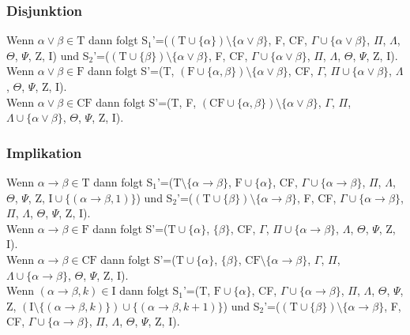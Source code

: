 \subsubsection{Disjunktion}
Wenn $\alpha\vee\beta\in\textrm{T}$ dann folgt S$_{1}$'=($(\textrm{T}\cup\lbrace\alpha\rbrace)\setminus\lbrace\alpha\vee\beta\rbrace$, F, CF, $\Gamma\cup\lbrace\alpha\vee\beta\rbrace$, $\Pi$, $\Lambda$, $\Theta$, $\Psi$, Z, I) und S$_{2}$'=($(\textrm{T}\cup\lbrace\beta\rbrace)\setminus\lbrace\alpha\vee\beta\rbrace$, F, CF, $\Gamma\cup\lbrace\alpha\vee\beta\rbrace$, $\Pi$, $\Lambda$, $\Theta$, $\Psi$, Z, I).\\
Wenn $\alpha\vee\beta\in\textrm{F}$ dann folgt S'=(T, $(\textrm{F}\cup\lbrace\alpha,\beta\rbrace)\setminus\lbrace\alpha\vee\beta\rbrace$, CF, $\Gamma$, $\Pi\cup\lbrace\alpha\vee\beta\rbrace$, $\Lambda$, $\Theta$, $\Psi$, Z, I).\\
Wenn $\alpha\vee\beta\in\textrm{CF}$ dann folgt S'=(T, F, $(\textrm{CF}\cup\lbrace\alpha,\beta\rbrace)\setminus\lbrace\alpha\vee\beta\rbrace$, $\Gamma$, $\Pi$, $\Lambda\cup\lbrace\alpha\vee\beta\rbrace$, $\Theta$, $\Psi$, Z, I).

\subsubsection{Implikation}
Wenn $\alpha\rightarrow\beta\in\textrm{T}$ dann folgt S$_{1}$'=($\textrm{T}\setminus\lbrace\alpha\rightarrow\beta\rbrace$, $\textrm{F}\cup\lbrace\alpha\rbrace$, CF, $\Gamma\cup\lbrace\alpha\rightarrow\beta\rbrace$, $\Pi$, $\Lambda$, $\Theta$, $\Psi$, Z, $\textrm{I}\cup\lbrace(\alpha\rightarrow\beta, 1)\rbrace$) und S$_{2}$'=($(\textrm{T}\cup\lbrace\beta\rbrace)\setminus\lbrace\alpha\rightarrow\beta\rbrace$, F, CF, $\Gamma\cup\lbrace\alpha\rightarrow\beta\rbrace$, $\Pi$, $\Lambda$, $\Theta$, $\Psi$, Z, I).\\
Wenn $\alpha\rightarrow\beta\in\textrm{F}$ dann folgt S'=($\textrm{T}\cup\lbrace\alpha\rbrace$, $\lbrace\beta\rbrace$, CF, $\Gamma$, $\Pi\cup\lbrace\alpha\rightarrow\beta\rbrace$, $\Lambda$, $\Theta$, $\Psi$, Z, I).\\
Wenn $\alpha\rightarrow\beta\in\textrm{CF}$ dann folgt S'=($\textrm{T}\cup\lbrace\alpha\rbrace$, $\lbrace\beta\rbrace$, $\textrm{CF}\setminus\lbrace\alpha\rightarrow\beta\rbrace$, $\Gamma$, $\Pi$, $\Lambda\cup\lbrace\alpha\rightarrow\beta\rbrace$, $\Theta$, $\Psi$, Z, I).\\
Wenn $(\alpha\rightarrow\beta, k)\in\textrm{I}$ dann folgt S$_{1}$'=(T, $\textrm{F}\cup\lbrace\alpha\rbrace$, CF, $\Gamma\cup\lbrace\alpha\rightarrow\beta\rbrace$, $\Pi$, $\Lambda$, $\Theta$, $\Psi$, Z, $(\textrm{I}\setminus\lbrace(\alpha\rightarrow\beta, k)\rbrace)\cup\lbrace(\alpha\rightarrow\beta, k+1)\rbrace$) und S$_{2}$'=($(\textrm{T}\cup\lbrace\beta\rbrace)\setminus\lbrace\alpha\rightarrow\beta\rbrace$, F, CF, $\Gamma\cup\lbrace\alpha\rightarrow\beta\rbrace$, $\Pi$, $\Lambda$, $\Theta$, $\Psi$, Z, I).

